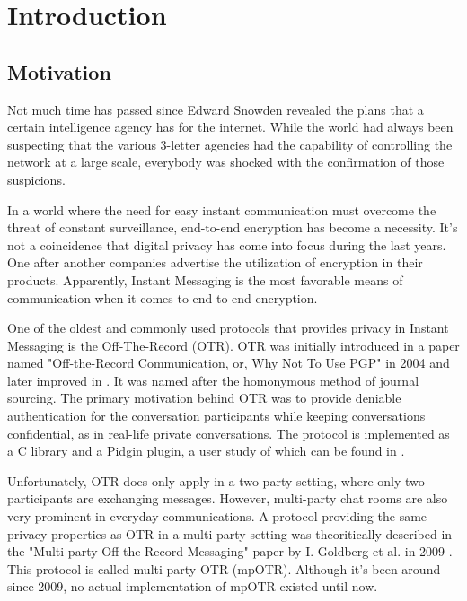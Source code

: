 \chapter{Introduction}

\label{chapter:introduction}




\section{Motivation}
Not much time has passed since Edward Snowden revealed the plans that a certain intelligence agency has for the internet. While the world had always been suspecting that the various 3-letter agencies had the capability of controlling the network at a large scale, everybody was shocked with the confirmation of those suspicions.

In a world where the need for easy instant communication must overcome the threat of constant surveillance, end-to-end encryption has become a necessity. It's not a coincidence that digital privacy has come into focus during the last years. One after another companies advertise the utilization of encryption in their products. Apparently, Instant Messaging is the most favorable means of communication when it comes to end-to-end encryption.

One of the oldest and commonly used protocols that provides privacy in Instant Messaging is the Off-The-Record (OTR). OTR was initially introduced in a paper named "Off-the-Record Communication, or, Why Not To Use PGP" in 2004 \cite{otr} and later improved in \cite{otr_improvedauth}. It was named after the homonymous method of journal sourcing. The primary motivation behind OTR was to provide deniable authentication for the conversation participants while keeping conversations confidential, as in real-life private conversations. The protocol is implemented as a C library and a Pidgin plugin, a user study of which can be found in \cite{otr_userstudy}.

Unfortunately, OTR does only apply in a two-party setting, where only two participants are exchanging messages. However, multi-party chat rooms are also very prominent in everyday communications. A protocol providing the same privacy properties as OTR in a multi-party setting was theoritically described in the "Multi-party Off-the-Record Messaging" paper by I. Goldberg et al. in 2009 \cite{mpotr}. This protocol is called multi-party OTR (mpOTR). Although it's been around since 2009, no actual implementation of mpOTR existed until now.

